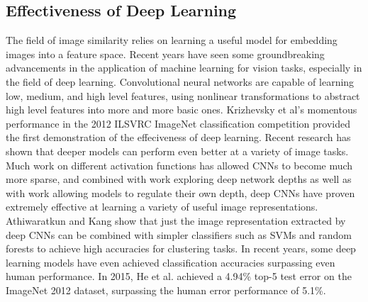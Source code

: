 \documentclass[pageno]{jpaper}
\begin{document}
\subsection{Effectiveness of Deep Learning}
The field of image similarity relies on learning a useful model for embedding images into a feature space. Recent years have seen some groundbreaking advancements in the application of machine learning for vision tasks, especially in the field of deep learning. Convolutional neural networks\cite{lecun1989backpropagation} are capable of learning low, medium, and high level features, using nonlinear transformations to abstract high level features into more and more basic ones. Krizhevsky et al's momentous performance in the 2012 ILSVRC ImageNet classification competition provided the first demonstration of the effeciveness of deep learning.\cite{krizhevsky2012imagenet} Recent research has shown that deeper models can perform even better at a variety of image tasks.\cite{szegedy2015going} Much work on different activation functions has allowed CNNs to become much more sparse, and combined with work exploring deep network depths\cite{simonyan2014very}\cite{szegedy2015going} as well as with work allowing models to regulate their own depth\cite{he2016deep}, deep CNNs have proven extremely effective at learning a variety of useful image representations. Athiwaratkun and Kang show that just the image representation extracted by deep CNNs can be combined with simpler classifiers such as SVMs and random forests to achieve high accuracies for clustering tasks.\cite{athiwaratkun2015feature} In recent years, some deep learning models have even achieved classification accuracies surpassing even human performance. In 2015, He et al. achieved a 4.94\% top-5 test error on the ImageNet 2012 dataset, surpassing the human error performance of 5.1\%\cite{he2016deep}.\\
\end{document}

